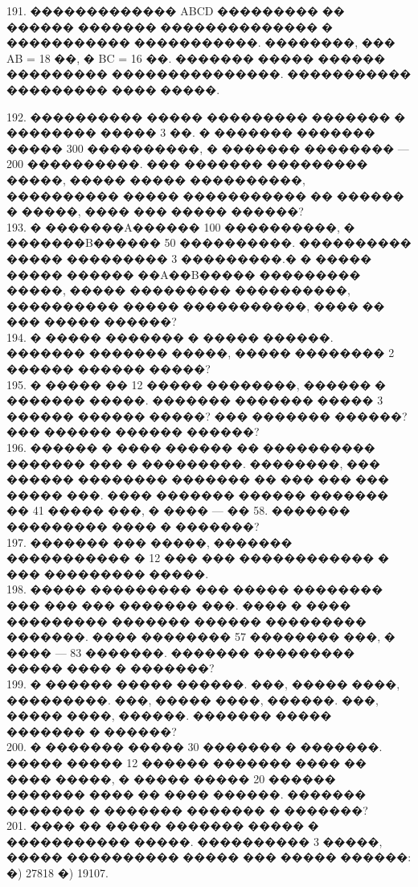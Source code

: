 \documentclass[12pt]{article}
\begin{document}
191. ������������� ABCD ��������� �� ������ ������� �������������� � ����������� �����������. ��������, ��� AB = 18 ��, � BC = 16 ��. ������� ����� ������ ��������� ���������������. ����������� ��������� ���� �����.
\begin{center}
\begin{figure}[ht!]
\end{figure}
\end{center}
192. ���������� ����� ��������� ������� � �������� ����� 3 ��. � ������� ������� ����� 300 ����������, � ������� �������� --- 200 ����������. ��� ������� ��������� �����, ����� ����� ����������, ���������� ����� ����������� �� ������ � �����, ���� ��� ����� ������?\\
193. � �������A������ 100 ����������, � �������B������ 50 ����������. ���������� ����� ��������� 3 ���������.�
� ����� ����� ������ ��A��B����� ��������� �����, ����� ��������� ����������, ���������� ����� �����������, ���� �� ��� ����� ������?\\
194. � ����� ������� � ����� ������. ������� ������� �����, ����� �������� 2 ������ ������ �����?\\
195. � ����� �� 12 ����� ��������, ������ � ������� �����. ������� ������� ����� 3 ������ ������ �����? ��� ������� ������? ��� ������ ������ ������?\\
196. ������ � ���� ������ �� ���������� ������� ��� � ���������. ��������, ��� ������ �������� ������� �� ��� ��� ��� ����� ���. ���� ������� ������ ������� �� 41 ����� ���, � ���� --- �� 58. ������� ��������� ���� � �������?\\
197. ������� ��� �����, ������� ����������� � 12 ��� ��� ������������ � ��� ��������� �����.\\
198. ����� ��������� ��� ����� �������� ��� ��� ��� ������� ���. ���� � ���� ��������� ������� ������ ��������� �������. ���� �������� 57 �������� ���, � ���� --- 83 �������. ������� ��������� ����� ���� � �������?\\
199. � ������ ����� ������. ���, ����� ����, ���������. ���, ����� ����, ������. ���, ����� ����, ������. ������� ����� ������� � ������?\\
200. � ������� ����� 30 ������� � �������. ����� ����� 12 ������ ������� ���� �� ���� �����, � ����� ����� 20 ������ ������� ���� �� ���� ������. ������� ������� � ������� ������� � �������?\\
201. ���� �� ����� ������� ����� � ����������� �����. ���������� 3 �����, ����� ���������� ����� ��� ����� ������: �) 27818 �) 19107.\\
\end{document}

